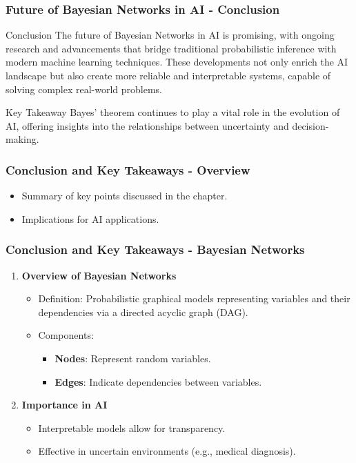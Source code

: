 \documentclass[aspectratio=169]{beamer}
\begin{document}
\begin{frame}[fragile]
    \frametitle{Future of Bayesian Networks in AI - Conclusion}
    \begin{block}{Conclusion}
        The future of Bayesian Networks in AI is promising, with ongoing research and advancements that bridge traditional probabilistic inference with modern machine learning techniques. 
        These developments not only enrich the AI landscape but also create more reliable and interpretable systems, capable of solving complex real-world problems.
    \end{block}
    
    \begin{block}{Key Takeaway}
        Bayes' theorem continues to play a vital role in the evolution of AI, offering insights into the relationships between uncertainty and decision-making.
    \end{block}
\end{frame}

\begin{frame}[fragile]
    \frametitle{Conclusion and Key Takeaways - Overview}
    \begin{itemize}
        \item Summary of key points discussed in the chapter.
        \item Implications for AI applications.
    \end{itemize}
\end{frame}

\begin{frame}[fragile]
    \frametitle{Conclusion and Key Takeaways - Bayesian Networks}
    \begin{enumerate}
        \item \textbf{Overview of Bayesian Networks}
        \begin{itemize}
            \item Definition: Probabilistic graphical models representing variables and their dependencies via a directed acyclic graph (DAG).
            \item Components:
            \begin{itemize}
                \item \textbf{Nodes}: Represent random variables.
                \item \textbf{Edges}: Indicate dependencies between variables.
            \end{itemize}
        \end{itemize}
        
        \item \textbf{Importance in AI}
        \begin{itemize}
            \item Interpretable models allow for transparency.
            \item Effective in uncertain environments (e.g., medical diagnosis).
        \end{itemize}
    \end{enumerate}
\end{frame}
\end{document}

